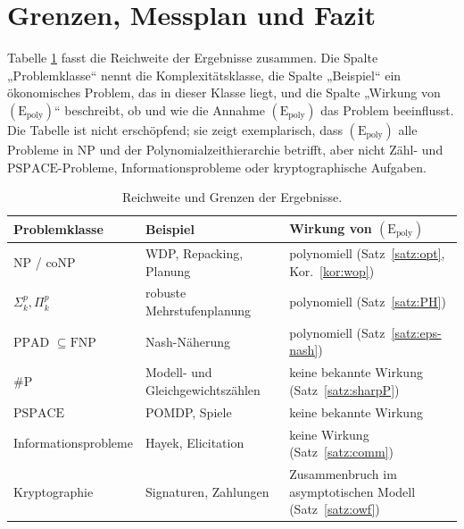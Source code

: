 \documentclass[a4paper,12pt]{article}
\theoremstyle{definition}
\newcommand{\cNP}{\ensuremath{\mathrm{NP}}}
\newcommand{\cCoNP}{\ensuremath{\mathrm{coNP}}}
\newcommand{\cFNP}{\ensuremath{\mathrm{FNP}}}
\newcommand{\cPSPACE}{\ensuremath{\mathrm{PSPACE}}}
\newcommand{\cPPAD}{\ensuremath{\mathrm{PPAD}}}
\newcommand{\sharpP}{\ensuremath{\#\mathrm{P}}}
\newcommand{\Epoly}{(\mathrm{E}_{\mathrm{poly}})}
\begin{document}
\section{Grenzen, Messplan und Fazit}
\label{eco:limits}

Tabelle \ref{tab:grenzen} fasst die Reichweite der Ergebnisse zusammen. Die Spalte „Problemklasse“ nennt die Komplexitätsklasse, die Spalte „Beispiel“ ein ökonomisches Problem, das in dieser Klasse liegt, und die Spalte „Wirkung von \(\Epoly\)“ beschreibt, ob und wie die Annahme \(\Epoly\) das Problem beeinflusst. Die Tabelle ist nicht erschöpfend; sie zeigt exemplarisch, dass \(\Epoly\) alle Probleme in \cNP{} und der Polynomialzeithierarchie betrifft, aber nicht Zähl- und \cPSPACE-Probleme, Informationsprobleme oder kryptographische Aufgaben.

\begin{table}[ht]
\centering\small
\begin{tabular}{p{4.3cm}p{3.4cm}p{6.2cm}}
\toprule
Problemklasse & Beispiel & Wirkung von \(\Epoly\)\\
\midrule
\cNP{} / \cCoNP & WDP, Repacking, Planung & polynomiell (Satz~\ref{satz:opt}, Kor.~\ref{kor:wop})\\
\(\Sigma_k^p,\Pi_k^p\) & robuste Mehrstufenplanung & polynomiell (Satz~\ref{satz:PH})\\
\cPPAD{} $\subseteq\cFNP$ & Nash-Näherung & polynomiell (Satz~\ref{satz:eps-nash})\\
\sharpP & Modell- und Gleichgewichtszählen & keine bekannte Wirkung (Satz~\ref{satz:sharpP})\\
\cPSPACE & POMDP, Spiele & keine bekannte Wirkung\\
Informationsprobleme & Hayek, Elicitation & keine Wirkung (Satz~\ref{satz:comm})\\
Kryptographie & Signaturen, Zahlungen & Zusammenbruch im asymptotischen Modell (Satz~\ref{satz:owf})\\
\bottomrule
\end{tabular}
\caption{Reichweite und Grenzen der Ergebnisse.}\label{tab:grenzen}
\end{table}
\end{document}
